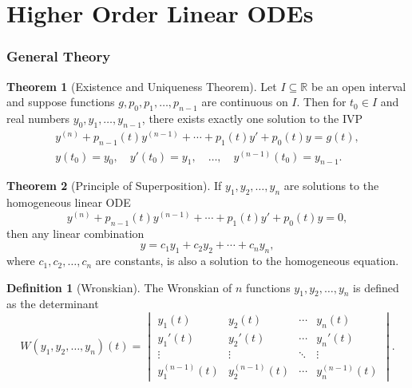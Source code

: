 \documentclass[10pt,UTF8]{article}
\newenvironment{definitionBox}
{
  \begin{tcolorbox}[colback=blue!5!white,colframe=blue!75!black,parbox=false,before
  upper=\par,before lower=\par]}
  {
\end{tcolorbox}}
\newenvironment{theoremBox}
{
  \begin{tcolorbox}[colback=yellow!5!white,colframe=yellow!75!black,parbox=false,before
  upper=\par,before lower=\par]}
  {
\end{tcolorbox}}
\theoremstyle{definition}
\newtheorem{definition inner}{Definition}[section]
\newenvironment{definition}[1][]
{
  \begin{definitionBox}
  \begin{definition inner}[#1]\hfill\par}
    {
    \end{definition inner}
\end{definitionBox}}
\theoremstyle{definition}
\newtheorem{theorem inner}{Theorem}[section]
\newenvironment{theorem}[1][]
{
  \begin{theoremBox}
  \begin{theorem inner}[#1]\hfill\par}
    {
    \end{theorem inner}
\end{theoremBox}}
\theoremstyle{definition}
\newtheorem*{proof inner}{\textit{Proof}}
\theoremstyle{plain}
\newtheorem{tip inner}{Tip}[section]
\theoremstyle{remark}
\begin{document}
\part*{Higher Order Linear ODEs}

\section{General Theory}

\begin{theorem}[Existence and Uniqueness Theorem]
  {}\label{thm: Existence and Uniqueness Thm for Higher Order Linear Eq}
  Let \(I \subseteq \mathbb{R}\) be an open interval and suppose
  functions \(g, p_0, p_1, \ldots, p_{n-1}\) are continuous on \(I\).
  Then for \(t_0 \in I\) and real numbers \(y_0, y_1, \ldots, y_{n-1}\),
  there exists exactly one solution to the IVP
  \begin{gather*}
    y^{(n)} + p_{n-1}(t) y^{(n-1)} + \cdots + p_1(t) y' + p_0(t) y = g(t), \\
    y(t_0) = y_0, \quad
    y'(t_0) = y_1, \quad
    \ldots, \quad
    y^{(n-1)}(t_0) = y_{n-1}.
  \end{gather*}
\end{theorem}

\begin{theorem}[Principle of Superposition]
  {}\label{thm: Principle of Superposition}
  If \(y_1, y_2, \ldots, y_n\) are solutions to the homogeneous linear ODE
  \begin{equation*}
    y^{(n)} + p_{n-1}(t) y^{(n-1)} + \cdots + p_1(t) y' + p_0(t) y = 0,
  \end{equation*}
  then any linear combination
  \begin{equation*}
    y = c_1 y_1 + c_2 y_2 + \cdots + c_n y_n,
  \end{equation*}
  where \(c_1, c_2, \ldots, c_n\) are constants, is also a solution
  to the homogeneous equation.
\end{theorem}

\begin{definition}[Wronskian]
  {}\label{def: Wronskian}
  The Wronskian of \(n\) functions \(y_1, y_2, \ldots, y_n\) is
  defined as the determinant
  \begin{equation*}
    W(y_1, y_2, \ldots, y_n)(t) =
    \begin{vmatrix}
      y_1(t) & y_2(t) & \cdots & y_n(t) \\
      y_1'(t) & y_2'(t) & \cdots & y_n'(t) \\
      \vdots & \vdots & \ddots & \vdots \\
      y_1^{(n-1)}(t) & y_2^{(n-1)}(t) & \cdots & y_n^{(n-1)}(t)
    \end{vmatrix}.
  \end{equation*}
\end{definition}
\end{document}
